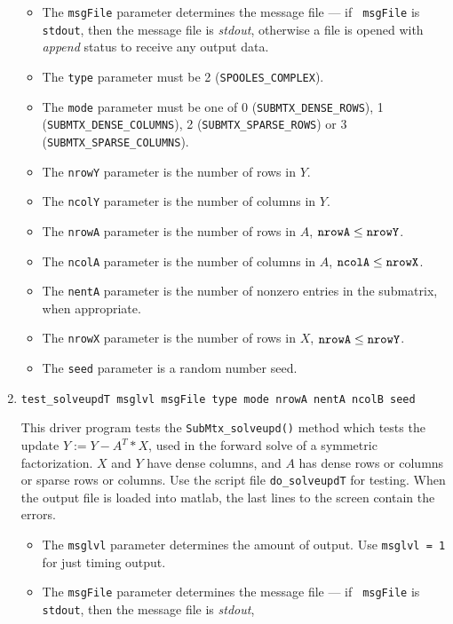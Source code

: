 \begin{enumerate}
\begin{itemize}
\item
The {\tt msgFile} parameter determines the message file --- if {\tt
msgFile} is {\tt stdout}, then the message file is {\it stdout},
otherwise a file is opened with {\it append} status to receive any
output data.
\item
The {\tt type} parameter must be 2 ({\tt SPOOLES\_COMPLEX}). 
\item
The {\tt mode} parameter must be one of
0 ({\tt SUBMTX\_DENSE\_ROWS}),
1 ({\tt SUBMTX\_DENSE\_COLUMNS}),
2 ({\tt SUBMTX\_SPARSE\_ROWS}) or
3 ({\tt SUBMTX\_SPARSE\_COLUMNS}).
\item
The {\tt nrowY} parameter is the number of rows in $Y$.
\item
The {\tt ncolY} parameter is the number of columns in $Y$.
\item
The {\tt nrowA} parameter is the number of rows in $A$,
${\tt nrowA} \le {\tt nrowY}$.
\item
The {\tt ncolA} parameter is the number of columns in $A$,
${\tt ncolA} \le {\tt nrowX}$.
\item
The {\tt nentA} parameter is the number of nonzero entries in the
submatrix, when appropriate.
\item
The {\tt nrowX} parameter is the number of rows in $X$,
${\tt nrowA} \le {\tt nrowY}$.
\item
The {\tt seed} parameter is a random number seed.
\end{itemize}
\item
\begin{verbatim}
test_solveupdT msglvl msgFile type mode nrowA nentA ncolB seed
\end{verbatim}
This driver program tests 
the {\tt SubMtx\_solveupd()} method
which tests the update $Y := Y - A^T * X$,
used in the forward solve of a symmetric factorization.
$X$ and $Y$ have dense columns,
and $A$ has dense rows or columns or sparse rows or columns.
Use the script file {\tt do\_solveupdT} for testing.
When the output file is loaded into matlab,
the last lines to the screen contain the errors.
\par
\begin{itemize}
\item
The {\tt msglvl} parameter determines the amount of output.
Use {\tt msglvl = 1} for just timing output.
\item
The {\tt msgFile} parameter determines the message file --- if {\tt
msgFile} is {\tt stdout}, then the message file is {\it stdout},

\end{itemize}
\end{enumerate}
